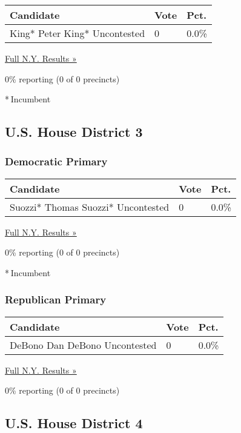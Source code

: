 \begin{longtable}[]{@{}lll@{}}
\toprule
Candidate & Vote & Pct.\tabularnewline
\midrule
\endhead
 King* Peter King* Uncontested & 0 & 0.0\%\tabularnewline
\bottomrule
\end{longtable}

\href{https://www.nytimes3xbfgragh.onion/elections/results/new-york}{Full
N.Y. Results »}

0\% reporting (0 of 0 precincts)

* Incumbent

\hypertarget{us-house-district-3}{%
\subsection{U.S. House District 3}\label{us-house-district-3}}

\hypertarget{democratic-primary-3}{%
\subsubsection{Democratic Primary}\label{democratic-primary-3}}

\begin{longtable}[]{@{}lll@{}}
\toprule
Candidate & Vote & Pct.\tabularnewline
\midrule
\endhead
 Suozzi* Thomas Suozzi* Uncontested & 0 & 0.0\%\tabularnewline
\bottomrule
\end{longtable}

\href{https://www.nytimes3xbfgragh.onion/elections/results/new-york}{Full
N.Y. Results »}

0\% reporting (0 of 0 precincts)

* Incumbent

\hypertarget{republican-primary-3}{%
\subsubsection{Republican Primary}\label{republican-primary-3}}

\begin{longtable}[]{@{}lll@{}}
\toprule
Candidate & Vote & Pct.\tabularnewline
\midrule
\endhead
 DeBono Dan DeBono Uncontested & 0 & 0.0\%\tabularnewline
\bottomrule
\end{longtable}

\href{https://www.nytimes3xbfgragh.onion/elections/results/new-york}{Full
N.Y. Results »}

0\% reporting (0 of 0 precincts)

\hypertarget{us-house-district-4}{%
\subsection{U.S. House District 4}\label{us-house-district-4}}

